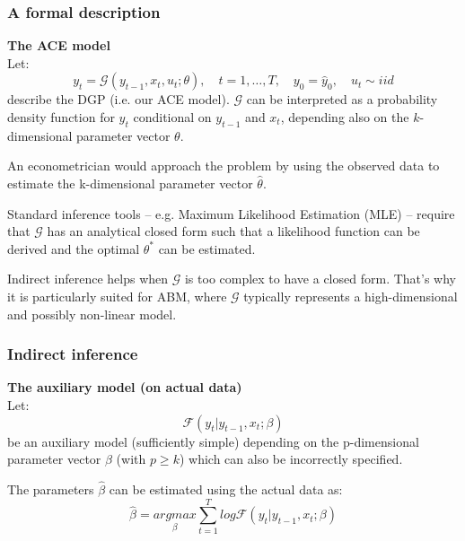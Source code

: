 \documentclass[10pt]{beamer}
\begin{document}
\begin{frame}[c]\frametitle{A formal description}
	\alert{\textbf{The ACE model}}
	\\ Let:
	\begin{equation}
		y_{t} = \mathcal{G}(y_{t-1}, x_{t}, u_{t}; \theta), \quad t = 1,\dots,T, \quad y_{0} = \hat{y}_{0}, \quad u_{t} \sim iid
	\end{equation}
	describe the DGP (i.e. our ACE model). $\mathcal{G}$ can be interpreted as a probability density function for $y_{t}$ conditional on $y_{t-1}$ and $x_{t}$, depending also on the $k$-dimensional parameter vector $\theta$. \medskip

	An econometrician would approach the problem by using the observed data to estimate the k-dimensional parameter vector $\hat{\theta}$. \medskip

	Standard inference tools -- e.g. Maximum Likelihood Estimation (MLE) -- require that $\mathcal{G}$ has an analytical closed form such that a likelihood function can be derived and the optimal $\theta^{*}$ can be estimated. \medskip 
	
	Indirect inference helps when $\mathcal{G}$ is too complex to have a closed form. That's why it is particularly suited for ABM, where $\mathcal{G}$ typically represents a high-dimensional and possibly non-linear model.
\end{frame}


\begin{frame}[c]\frametitle{Indirect inference}
    \alert{\textbf{The auxiliary model (on actual data)}}
	\\ Let:
	\begin{equation}
		\mathcal{F}(y_{t} | y_{t-1}, x_{t}; \beta)
	\end{equation}
	be an auxiliary model (sufficiently simple) depending on the p-dimensional parameter vector $\beta$ (with $p \geq k$) which can also be incorrectly specified. \medskip %

	The parameters $\hat{\beta}$ can be estimated using the actual data as:
	\begin{equation}
		\hat{\beta} = \underset{\beta}{argmax} \sum_{t=1}^{T} log \mathcal{F}(y_{t} | y_{t-1}, x_{t}; \beta)
	\end{equation}
\end{frame}
\end{document}
